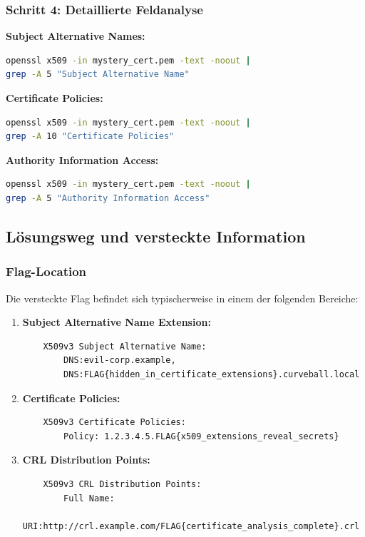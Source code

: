 \documentclass{article}
\begin{document}
\subsubsection{Schritt 4: Detaillierte Feldanalyse}

\textbf{Subject Alternative Names:}
\begin{lstlisting}[language=bash]
openssl x509 -in mystery_cert.pem -text -noout | 
grep -A 5 "Subject Alternative Name"
\end{lstlisting}

\textbf{Certificate Policies:}
\begin{lstlisting}[language=bash]
openssl x509 -in mystery_cert.pem -text -noout | 
grep -A 10 "Certificate Policies"
\end{lstlisting}

\textbf{Authority Information Access:}
\begin{lstlisting}[language=bash]
openssl x509 -in mystery_cert.pem -text -noout | 
grep -A 5 "Authority Information Access"
\end{lstlisting}

\subsection{Lösungsweg und versteckte Information}

\subsubsection{Flag-Location}
Die versteckte Flag befindet sich typischerweise in einem der folgenden Bereiche:

\begin{enumerate}
    \item \textbf{Subject Alternative Name Extension:} 
    \begin{lstlisting}
    X509v3 Subject Alternative Name:
        DNS:evil-corp.example, 
        DNS:FLAG{hidden_in_certificate_extensions}.curveball.local
    \end{lstlisting}
    
    \item \textbf{Certificate Policies:}
    \begin{lstlisting}
    X509v3 Certificate Policies:
        Policy: 1.2.3.4.5.FLAG{x509_extensions_reveal_secrets}
    \end{lstlisting}
    
    \item \textbf{CRL Distribution Points:}
    \begin{lstlisting}
    X509v3 CRL Distribution Points:
        Full Name:
          URI:http://crl.example.com/FLAG{certificate_analysis_complete}.crl
    \end{lstlisting}
\end{enumerate}
\end{document}
